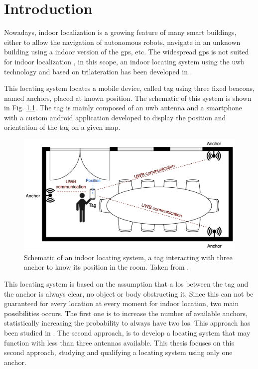 % 			 
%
%

\chapter{Introduction}
\setcounter{page}{1}
\label{introduction}

Nowadays, indoor localization is a growing feature of many smart buildings, either to allow the navigation of autonomous robots, navigate in an unknown building using a indoor version of the \gls{gps}, etc. The widespread \gls{gps} is not suited for indoor localization \cite{bejuri2013ubiquitous} \cite{kulmer2017using}, in this scope, an indoor locating system using the \gls{uwb} technology and based on trilateration has been developed in \cite{hannotier2019indoor}.
\vspace{2mm}

This locating system locates a mobile device, called tag using three fixed beacons, named anchors, placed at known position. The schematic of this system is shown in Fig. \ref{fig:schem_loc}. The tag is mainly composed of an \gls{uwb} antenna and a smartphone with a custom android application developed to display the position and orientation of the tag on a given map.

\begin{figure}[H]
\centering
\includegraphics[width=.8\linewidth]{Images/schem_loc.png}
\caption{Schematic of an indoor locating system, a tag interacting with three anchor to know its position in the room. Taken from \cite{hannotier2019indoor}.\label{fig:schem_loc}}
\end{figure}

This locating system is based on the assumption that a \gls{los} between the tag and the anchor is always clear, no object or body obstructing it. Since this can not be guaranteed for every location at every moment for indoor location, two main possibilities occurs. The first one is to increase the number of available anchors, statistically increasing the probability to always have two \gls{los}. This approach has been studied in \cite{guyard2019navigation}. The second approach, is to develop a locating system that may function with less than three antennas available. This thesis focuses on this second approach, studying and qualifying a locating system using only one anchor.
\vspace{2mm}

